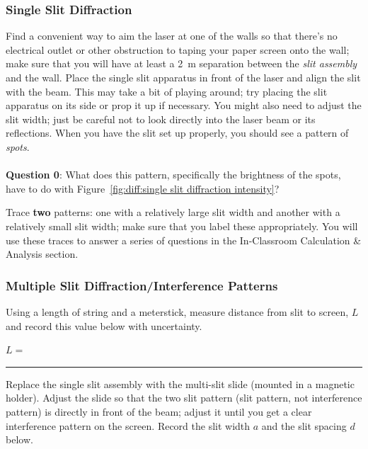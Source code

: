 \subsubsection{Single Slit Diffraction}  

Find a convenient way to aim the laser at one of the walls so that there's
no electrical outlet or other obstruction to taping your paper screen onto the
wall; make sure that you will have at least a 2~m separation between the 
{\it slit assembly} and the wall.  Place the single slit apparatus in front of 
the laser and align the slit with the beam. This may take a bit of playing 
around; try placing the slit apparatus on its side or prop it up if necessary. 
You might also need to adjust the slit width; just be careful not to look 
directly into the laser beam or its reflections.  When you have the slit set 
up properly, you should see a pattern of {\it spots}. \\ 
\vspace*{.3cm} \\
{\bf Question 0}: What does this pattern, 
specifically the brightness of the spots, have to do with 
Figure~\ref{fig:diff:single slit diffraction intensity}?   \\

\clearpage

\noindent Trace {\bf two} patterns: one with a relatively large slit 
width and another with a 
relatively small slit width; make sure that you label these appropriately.   
You will use these traces to answer a series of questions in the In-Classroom
Calculation \& Analysis section.  


\subsubsection{Multiple Slit Diffraction/Interference Patterns} 
\label{sec:diff:multislitproc}

\noindent Using a length of string and a meterstick, 
measure distance from slit 
to screen, $L$ and record this value below with uncertainty.
\begin{center}
$L=$~ \rule{3cm}{.1mm} 
\end{center}
Replace the single slit assembly with the multi-slit slide (mounted in a 
magnetic holder).  Adjust the slide
so that the two slit pattern (slit pattern, not interference pattern) is 
directly in front of the beam; adjust it until you get a clear interference 
pattern on the screen. Record the slit width $a$ and the slit spacing 
$d$ below.

